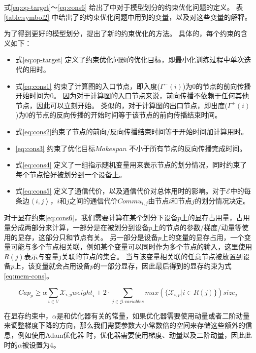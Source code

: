 式\ref{eq:op-target}～\ref{eq:cons6} 给出了\sys{}中对于模型划分的约束优化问题的定义。
表\ref{table:symbol2} 中给出了\sys{}的约束优化问题中用到的变量，以及对这些变量的解释。


为了得到更好的模型划分，\sys{}提出了新的约束优化的方法。
具体的，每个约束的含义如下：
\begin{itemize}
	\item 式\ref{eq:op-target} 定义了约束优化问题的优化目标，即最小化训练过程中单次迭代的用时。
	\item 式\ref{eq:cons1} 约束了计算图的入口节点，即入度($\Gamma^{-}(i)$)为0的节点的前向传播开始时间为0。
	因为对于计算图的入口节点来说，前向传播不依赖于任何其他节点，因此可以立刻开始。
	类似的，对于计算图的出口节点，即出度($\Gamma^{+}(i)$)为0的节点的反向传播的开始时间等于该节点的前向传播结束时间。
	\item 式\ref{eq:cons2}约束了节点的前向/反向传播结束时间等于开始时间加计算用时。
	\item \ref{eq:cons3} 约束了优化目标$\mathit{Makespan}$ 不小于所有节点的反向传播完成时间。
	\item 式\ref{eq:cons4} 定义了一组指示随机变量用来表示节点的划分情况，同时约束了每个节点恰好被划分到一个设备上。
	\item 式\ref{eq:cons5} 定义了通信代价，以及通信代价对总体用时的影响。对于$\mathcal{E}$中的每条边$\left\langle i,j\right\rangle $，$i$和$j$之间的通信代价$\mathit{Commu}_{i,j}$由节点$i$和节点$j$的划分情况决定。
\end{itemize}

对于显存约束\ref{eq:cons6}，我们需要计算在某个划分下设备$p$上的显存占用量，占用量分成两部分来计算，一部分是在被划分到设备$p$上的节点的参数/梯度/动量等使用的显存，这部分只和节点有关。
另一部分是设备$p$上的变量的显存占用，一个变量可能与多个节点相关联，例如某个变量可以同时作为多个节点的输入，这里使用$R(j)$表示与变量$j$关联的节点的集合。
当与该变量相关联的任意节点被放置到设备$p$上，该变量就会占用设备$p$的一部分显存，因此最后得到的显存约束为式\ref{eq:mem-cons}。

\begin{equation}
	\label{eq:mem-cons}
	\mathit{Cap}_p \ge \alpha  \sum_{i\in V} \mathcal{X}_{i,p} \mathit{weight}_i + 2\cdot \sum_{j\in \mathcal{G}.\mathit{variables}} \mathit{max}(\{\mathcal{X}_{i,p} |  i\in R(j)\}) \mathit{size}_{j}
\end{equation}

在显存约束中，$\alpha$是和优化器有关的常量，如果优化器需要使用动量或者二阶动量来调整梯度下降的方向，那么我们需要参数大小常数倍的空间来存储这些额外的信息，例如使用Adam优化器 时，优化器需要使用梯度、动量以及二阶动量，因此此时的$\alpha$被设置为4。

